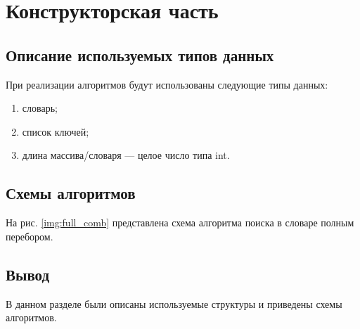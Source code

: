 \chapter{Конструкторская часть}

\section{Описание используемых типов данных}
При реализации алгоритмов будут использованы следующие типы данных:
\begin{enumerate}[label=\arabic*), itemindent=1em]
	\item словарь;
	\item список ключей;
	\item длина массива/словаря --- целое число типа int.
\end{enumerate}

\section{Схемы алгоритмов}
На рис. \ref{img:full_comb} представлена схема алгоритма поиска в словаре полным перебором.
\begin{center}	
	\centering
	\def\svgwidth{10cm}
	
	\label{img:full_comb}
\end{center}
\section*{\hsp Вывод}
В данном разделе были описаны используемые структуры и приведены схемы алгоритмов.